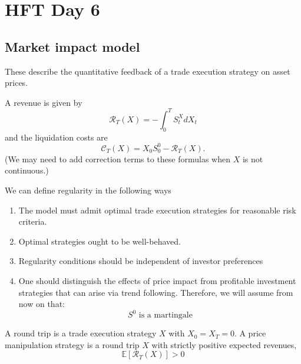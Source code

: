 \chapter{HFT Day 6}

\section{Market impact model}
These describe the quantitative feedback of a trade execution strategy on asset prices.

A revenue is given by
\begin{equation}
	\mathcal{R}_T(X) = -\int_0^T S_t^X dX_t
\end{equation}
and the liquidation costs are
\begin{equation}
	\mathcal{C}_T(X) = X_0S_0^0 - \mathcal{R}_T(X).
\end{equation}
(We may need to add correction terms to these formulas when $X$ is not continuous.)

We can define regularity in the following ways
\begin{enumerate}
	\item The model must admit optimal trade execution strategies for reasonable risk criteria.
	\item Optimal strategies ought to be well-behaved.
	\item Regularity conditions should be independent of investor preferences
	\item One should distinguish the effects of price impact from profitable investment strategies that can arise via trend following. Therefore, we will assume from now on that:
	{\begin{equation}
		S^0 \text{ is a martingale}
	\end{equation}}
\end{enumerate}

\begin{definition}\label{def:price_manipulation}
	A round trip is a trade execution strategy $X$ with $X_0=X_T=0$. A price manipulation strategy is a round trip $X$ with strictly positive expected revenues, 
	\begin{equation}
		\mathbb{E}\left[ \mathcal{R}_T(X) \right] > 0
	\end{equation}
\end{definition}










